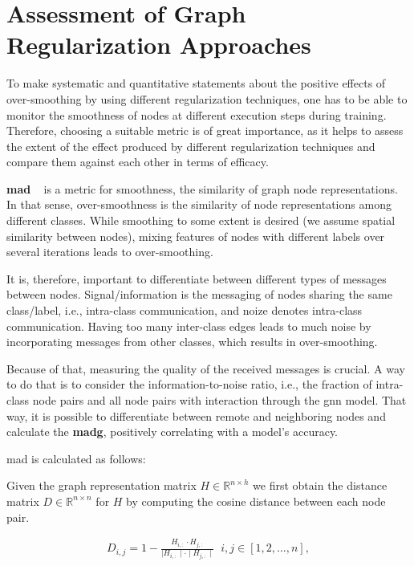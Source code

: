 \section{Assessment of Graph Regularization Approaches}
\label{sec:related:setup:choice:metrics}
To make systematic and quantitative statements about the positive effects of over-smoothing by using different regularization techniques, one has to be able to monitor the smoothness of nodes at different execution steps during training.
Therefore, choosing a suitable metric is of great importance, as it helps to assess the extent of the effect produced by different regularization techniques and compare them against each other in terms of efficacy.

\textbf{\Ac{mad}} ~\cite{Chen2020} is a metric for smoothness, the similarity of graph node representations.
In that sense, over-smoothness is the similarity of node representations among different classes.
While smoothing to some extent is desired (we assume spatial similarity between nodes), mixing features of nodes with different labels over several iterations leads to over-smoothing.

It is, therefore, important to differentiate between different types of messages between nodes.
Signal/information is the messaging of nodes sharing the same class/label, i.e., intra-class communication, and noize denotes intra-class communication.
Having too many inter-class edges leads to much noise by incorporating messages from other classes, which results in over-smoothing.

Because of that, measuring the quality of the received messages is crucial.
A way to do that is to consider the information-to-noise ratio, i.e., the fraction of intra-class node pairs and all node pairs with interaction through the \ac{gnn} model.
That way, it is possible to differentiate between remote and neighboring nodes and calculate the \textbf{\ac{madg}}, positively correlating with a model's accuracy.

\ac{mad} is calculated as follows:

Given the graph representation matrix $H \in \mathbb{R}^{n \times h}$ we
first obtain the distance matrix $D \in \mathbb{R}^{n \times n}$ for $H$ by
computing the cosine distance between each node pair.

\begin{align*}
    D_{i,j} = 1 - \frac{H_{i,:} \cdot H_{j,:}}{\mid H_{i,:}\mid  \cdot \mid H_{j,:}\mid} \; \;  i,j \in [1,2, \dots, n],
\end{align*}

